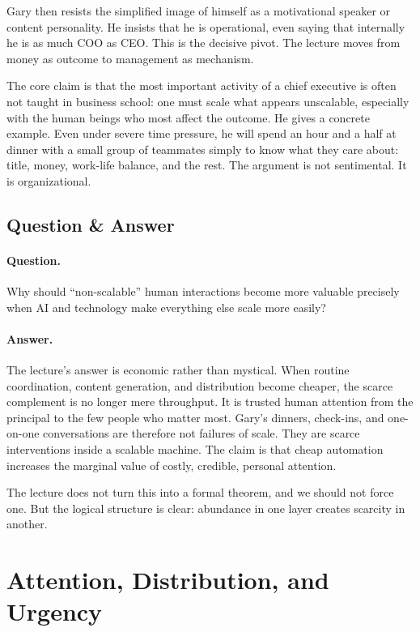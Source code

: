 Gary then resists the simplified image of himself as a motivational speaker or content personality. He insists that he is operational, even saying that internally he is as much COO as CEO. This is the decisive pivot. The lecture moves from money as outcome to management as mechanism.

The core claim is that the most important activity of a chief executive is often not taught in business school: one must scale what appears unscalable, especially with the human beings who most affect the outcome. He gives a concrete example. Even under severe time pressure, he will spend an hour and a half at dinner with a small group of teammates simply to know what they care about: title, money, work-life balance, and the rest. The argument is not sentimental. It is organizational.

\subsection{Question \& Answer}

\paragraph{Question.} Why should ``non-scalable'' human interactions become more valuable precisely when AI and technology make everything else scale more easily?

\paragraph{Answer.} The lecture's answer is economic rather than mystical. When routine coordination, content generation, and distribution become cheaper, the scarce complement is no longer mere throughput. It is trusted human attention from the principal to the few people who matter most. Gary's dinners, check-ins, and one-on-one conversations are therefore not failures of scale. They are scarce interventions inside a scalable machine. The claim is that cheap automation increases the marginal value of costly, credible, personal attention.

The lecture does not turn this into a formal theorem, and we should not force one. But the logical structure is clear: abundance in one layer creates scarcity in another.

\section{Attention, Distribution, and Urgency}

